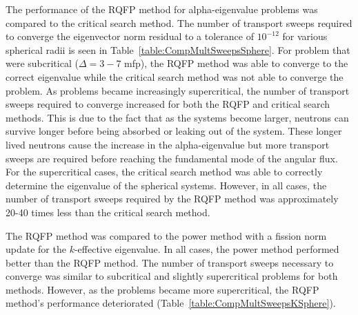 The performance of the RQFP method for alpha-eigenvalue problems was compared to the critical search method. The number of transport sweeps required to converge the eigenvector norm residual to a tolerance of $10^{-12}$ for various spherical radii is seen in Table~\ref{table:CompMultSweepsSphere}. For problem that were subcritical ($\Delta = 3 - 7$ mfp), the RQFP method was able to converge to the correct eigenvalue while the critical search method was not able to converge the problem. As problems became increasingly supercritical, the number of transport sweeps required to converge increased for both the RQFP and critical search methods. This is due to the fact that as the systems become larger, neutrons can survive longer before being absorbed or leaking out of the system. These longer lived neutrons cause the increase in the alpha-eigenvalue but more transport sweeps are required before reaching the fundamental mode of the angular flux. For the supercritical cases, the critical search method was able to correctly determine the eigenvalue of the spherical systems. However, in all cases, the number of transport sweeps required by the RQFP method was approximately 20-40 times less than the critical search method.

The RQFP method was compared to the power method with a fission norm update for the $k$-effective eigenvalue. In all cases, the power method performed better than the RQFP method. The number of transport sweeps necessary to converge was similar to subcritical and slightly supercritical problems for both methods. However, as the problems became more supercritical, the RQFP method's performance deteriorated (Table~\ref{table:CompMultSweepsKSphere}).

